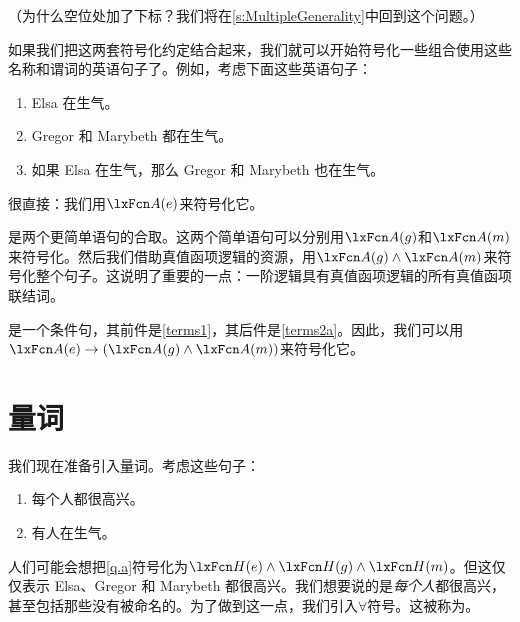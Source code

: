         （为什么空位处加了下标？我们将在\cref{s:MultipleGenerality}中回到这个问题。）


如果我们把这两套符号化约定结合起来，我们就可以开始符号化一些组合使用这些名称和谓词的英语句子了。例如，考虑下面这些英语句子：


\begin{enumerate}
		\item\label{terms1} Elsa 在生气。
		\item\label{terms2a} Gregor 和 Marybeth 都在生气。
		\item\label{terms2} 如果 Elsa 在生气，那么 Gregor 和 Marybeth 也在生气。
	\end{enumerate}


很直接：我们用$\atom{A}{e}$来符号化它。

是两个更简单语句的合取。这两个简单语句可以分别用$\atom{A}{g}$和$\atom{A}{m}$来符号化。然后我们借助真值函项逻辑的资源，用$\atom{A}{g} \eand \atom{A}{m}$来符号化整个句子。这说明了重要的一点：一阶逻辑具有真值函项逻辑的所有真值函项联结词。

是一个条件句，其前件是\cref*{terms1}，其后件是\cref*{terms2a}。因此，我们可以用$\atom{A}{e} \eif (\atom{A}{g} \eand \atom{A}{m})$来符号化它。

\section{量词}
我们现在准备引入量词。考虑这些句子：


\begin{enumerate}
		\item\label{q.a} 每个人都很高兴。
		\item\label{q.e} 有人在生气。
	\end{enumerate}


人们可能会想把\cref*{q.a}符号化为$\atom{H}{e} \eand \atom{H}{g} \eand \atom{H}{m}$。但这仅仅表示 Elsa、Gregor 和 Marybeth 都很高兴。我们想要说的是\emph{每个人}都很高兴，甚至包括那些没有被命名的。为了做到这一点，我们引入$\forall$符号。这被称为。


